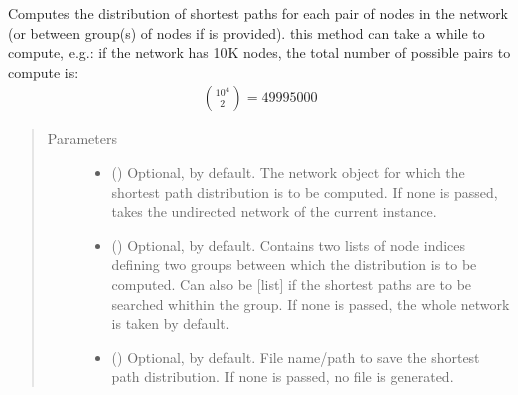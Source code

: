 \documentclass[letterpaper,10pt,english]{sphinxmanual}
\begin{document}
\begin{fulllineitems}
\begin{fulllineitems}
\begin{quote}
\begin{description}
\end{description}\end{quote}

\end{fulllineitems}


\begin{fulllineitems}
\label{\detokenize{reference:pypath.main.PyPath.shortest_path_dist}}
Computes the distribution of shortest paths for each pair of
nodes in the network (or between group(s) of nodes if 
is provided).  this method can take a while to compute,
e.g.: if the network has 10K nodes, the total number of possible
pairs to compute is:
\begin{equation*}
\begin{split}\binom{10^4}{2} = 49995000\end{split}
\end{equation*}\begin{quote}\begin{description}
\item[{Parameters}] \leavevmode\begin{itemize}
\item {} 
 () \textendash{} Optional,  by default. The network object for which
the shortest path distribution is to be computed. If none is
passed, takes the undirected network of the current
instance.

\item {} 
 () \textendash{} Optional,  by default. Contains two lists of node
indices defining two groups between which the distribution
is to be computed. Can also be {[}list{]} if the shortest paths
are to be searched whithin the group. If none is passed, the
whole network is taken by default.

\item {} 
 () \textendash{} Optional,  by default. File name/path to save the
shortest path distribution. If none is passed, no file is
generated.


\end{itemize}
\end{description}
\end{quote}
\end{fulllineitems}
\end{fulllineitems}
\end{document}
